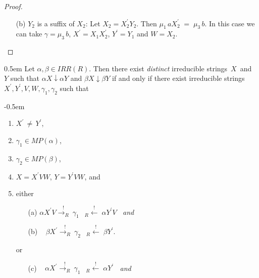 \documentclass{lmcs} %
\theoremstyle{plain}\newtheorem{satz}[thm]{Satz} %
\begin{document}
\begin{appendices}
\begin{proof}
\begin{enumerate}
  \item[(b)] $Y_2$ is a suffix of $X_2$: Let $X_2 = X_2^{\prime} Y_2$.
  Then ${\mu_{1}}\, a X_2^{\prime} \; = \; {\mu_{3}} \, b$.
  In this case we can take
  $\gamma = {\mu_{3}}\, b$, $X^{\prime} = X_1 X_2^{\prime}$, $Y^{\prime} = Y_1$
  and $W = X_2$. \qedhere
\end{enumerate}
\end{proof}

\vspace{0.1in}


\begin{lem}%
\openup 0.5em
  Let $\alpha, \beta \in IRR(R)$. Then there exist \emph{distinct}
  irreducible strings~$X$~and~$Y$ such that $\alpha X \downarrow
  \alpha Y$ and $\beta X \downarrow \beta Y$ if and only if there
  exist irreducible strings~$X^{\prime}, Y^{\prime}, V, W, \gamma_1^{}, \gamma_2^{}$ such that

\openup -0.5em
\begin{enumerate}

\item $X^{\prime} \, \neq \, Y^{\prime}$,

\item $\gamma_1^{} \in MP(\alpha)$,

\item $\gamma_2^{} \in MP(\beta)$,

\item $X = X^{\prime} V W$, $Y = Y^{\prime} VW$, and

\item either \begin{itemize}
  
  \item[(a)] $\alpha X^{\prime} V \stackrel{!}{{\longrightarrow}_{R}^{}} ~ \gamma_1^{} \; \; ~ {}_R^{}{\!{\stackrel{!}{\longleftarrow}}} \;
  \alpha Y^{\prime} V \; \; $ \emph{and}

  \item[(b)] $\; \; \; \beta X^{\prime} \stackrel{!}{{\longrightarrow}_{R}^{}} ~ \gamma_2^{} \; \; ~ {}_R^{}{\!{\stackrel{!}{\longleftarrow}}} \;
  \beta Y^{\prime}$.
  
\end{itemize} or \begin{itemize}

  \item[(c)] $\; \; \; \alpha X^{\prime} \stackrel{!}{{\longrightarrow}_{R}^{}} ~ \gamma_1^{} \; \; ~ {}_R^{}{\!{\stackrel{!}{\longleftarrow}}} \;
  \alpha Y^{\prime} \; \; $ \emph{and}


\end{itemize}
\end{enumerate}
\end{lem}
\end{appendices}
\end{document}
